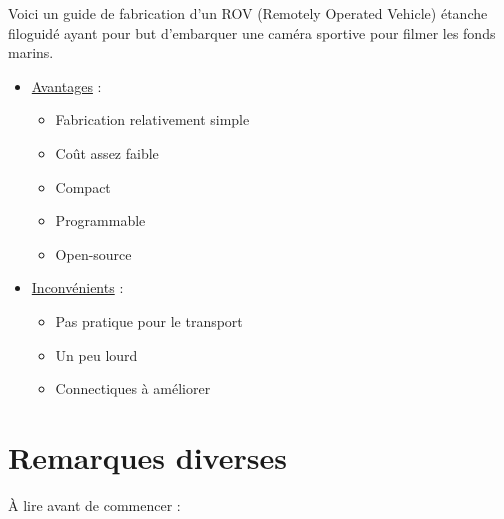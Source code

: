 \documentclass[11pt,a4paper]{article}
\begin{document}
    Voici un guide de fabrication d'un ROV (Remotely Operated Vehicle) étanche filoguidé ayant pour but d'embarquer une caméra sportive pour filmer les fonds marins. 
    \begin{itemize}
      \item \underline{Avantages} :
            \begin{itemize}
              \item Fabrication relativement simple
              \item Coût assez faible
              \item Compact
              \item Programmable
              \item Open-source
            \end{itemize}
      \item \underline{Inconvénients} : 
            \begin{itemize}
              \item Pas pratique pour le transport
              \item Un peu lourd
              \item Connectiques à améliorer
            \end{itemize}
    \end{itemize}

    
    

  
  \section{Remarques diverses}
    À lire avant de commencer :
  
\end{document}
